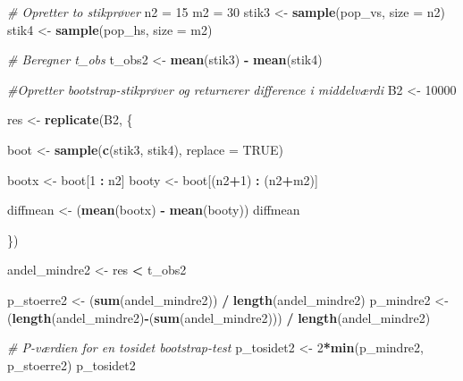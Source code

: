\documentclass[
]{book}
\newenvironment{Shaded}{\begin{snugshade}}{\end{snugshade}}
\newcommand{\CommentTok}[1]{\textcolor[rgb]{0.56,0.35,0.01}{\textit{#1}}}
\newcommand{\DataTypeTok}[1]{\textcolor[rgb]{0.13,0.29,0.53}{#1}}
\newcommand{\DecValTok}[1]{\textcolor[rgb]{0.00,0.00,0.81}{#1}}
\newcommand{\KeywordTok}[1]{\textcolor[rgb]{0.13,0.29,0.53}{\textbf{#1}}}
\newcommand{\NormalTok}[1]{#1}
\newcommand{\OperatorTok}[1]{\textcolor[rgb]{0.81,0.36,0.00}{\textbf{#1}}}
\newcommand{\OtherTok}[1]{\textcolor[rgb]{0.56,0.35,0.01}{#1}}
\newcommand{\StringTok}[1]{\textcolor[rgb]{0.31,0.60,0.02}{#1}}
\theoremstyle{definition}
\theoremstyle{definition}
\theoremstyle{definition}
\theoremstyle{remark}
\begin{document}
\begin{Shaded}
\begin{Highlighting}[]
\CommentTok{# Opretter to stikprøver}
\NormalTok{n2 =}\StringTok{ }\DecValTok{15}
\NormalTok{m2 =}\StringTok{ }\DecValTok{30}
\NormalTok{stik3 <-}\StringTok{ }\KeywordTok{sample}\NormalTok{(pop_vs, }\DataTypeTok{size =}\NormalTok{ n2)}
\NormalTok{stik4 <-}\StringTok{ }\KeywordTok{sample}\NormalTok{(pop_hs, }\DataTypeTok{size =}\NormalTok{ m2)}

\CommentTok{# Beregner t_obs}
\NormalTok{t_obs2 <-}\StringTok{ }\KeywordTok{mean}\NormalTok{(stik3) }\OperatorTok{-}\StringTok{ }\KeywordTok{mean}\NormalTok{(stik4)}

\CommentTok{#Opretter bootstrap-stikprøver og returnerer difference i middelværdi}
\NormalTok{B2 <-}\StringTok{ }\DecValTok{10000}

\NormalTok{res <-}\StringTok{ }\KeywordTok{replicate}\NormalTok{(B2, \{}
  
\NormalTok{  boot <-}\StringTok{ }\KeywordTok{sample}\NormalTok{(}\KeywordTok{c}\NormalTok{(stik3, stik4), }\DataTypeTok{replace =} \OtherTok{TRUE}\NormalTok{)}
  
\NormalTok{  bootx <-}\StringTok{ }\NormalTok{boot[}\DecValTok{1} \OperatorTok{:}\StringTok{ }\NormalTok{n2]}
\NormalTok{  booty <-}\StringTok{ }\NormalTok{boot[(n2}\OperatorTok{+}\DecValTok{1}\NormalTok{) }\OperatorTok{:}\StringTok{ }\NormalTok{(n2}\OperatorTok{+}\NormalTok{m2)]}
  
\NormalTok{  diffmean <-}\StringTok{ }\NormalTok{(}\KeywordTok{mean}\NormalTok{(bootx) }\OperatorTok{-}\StringTok{ }\KeywordTok{mean}\NormalTok{(booty))}
\NormalTok{  diffmean}
  
\NormalTok{\})}

\NormalTok{andel_mindre2 <-}\StringTok{ }\NormalTok{res }\OperatorTok{<}\StringTok{ }\NormalTok{t_obs2}

\NormalTok{p_stoerre2 <-}\StringTok{ }\NormalTok{(}\KeywordTok{sum}\NormalTok{(andel_mindre2)) }\OperatorTok{/}\StringTok{ }\KeywordTok{length}\NormalTok{(andel_mindre2)}
\NormalTok{p_mindre2 <-}\StringTok{ }\NormalTok{(}\KeywordTok{length}\NormalTok{(andel_mindre2)}\OperatorTok{-}\NormalTok{(}\KeywordTok{sum}\NormalTok{(andel_mindre2))) }\OperatorTok{/}\StringTok{ }\KeywordTok{length}\NormalTok{(andel_mindre2)}

\CommentTok{# P-værdien for en tosidet bootstrap-test}
\NormalTok{p_tosidet2 <-}\StringTok{ }\DecValTok{2}\OperatorTok{*}\KeywordTok{min}\NormalTok{(p_mindre2, p_stoerre2)}
\NormalTok{p_tosidet2}
\end{Highlighting}
\end{Shaded}
\end{document}
